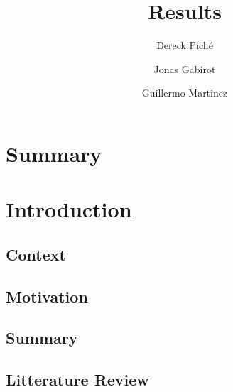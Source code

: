 \documentclass{article}
\title{Results}
\author
{
    Dereck Piché \and
    Jonas Gabirot \and
    Guillermo Martinez\and
}
\begin{document}
\maketitle
\section{Summary}
\section{Introduction}
\subsection{Context}
\subsection{Motivation}
\subsection{Summary}
\subsection{Litterature Review}
\end{document}
